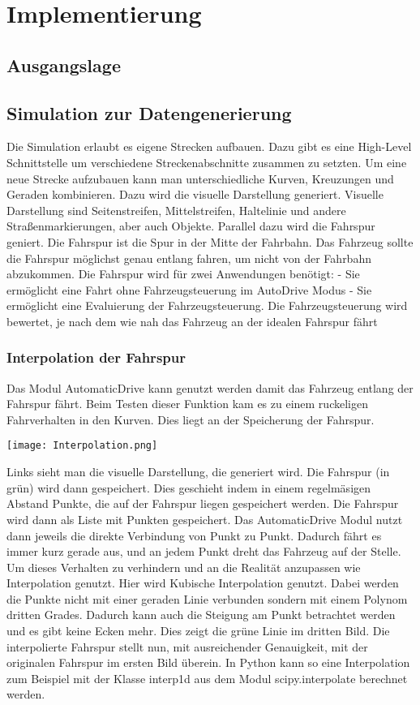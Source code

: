 
\chapter{Implementierung}

\section{Ausgangslage}

\section{Simulation zur Datengenerierung}
Die Simulation erlaubt es eigene Strecken aufbauen.
Dazu gibt es eine High-Level Schnittstelle um verschiedene Streckenabschnitte zusammen zu setzten.
Um eine neue Strecke aufzubauen kann man unterschiedliche Kurven, Kreuzungen und Geraden kombinieren.
Dazu wird die visuelle Darstellung generiert.
Visuelle Darstellung sind Seitenstreifen, Mittelstreifen, Haltelinie und andere Straßenmarkierungen, aber auch Objekte.
Parallel dazu wird die Fahrspur geniert. 
Die Fahrspur ist die Spur in der Mitte der Fahrbahn. 
Das Fahrzeug sollte die Fahrspur möglichst genau entlang fahren, um nicht von der Fahrbahn abzukommen.
Die Fahrspur wird für zwei Anwendungen benötigt:
 - Sie ermöglicht eine Fahrt ohne Fahrzeugsteuerung im AutoDrive Modus
 - Sie ermöglicht eine Evaluierung der Fahrzeugsteuerung. Die Fahrzeugsteuerung wird bewertet, je nach dem wie nah das Fahrzeug an der idealen Fahrspur fährt  

\subsection{Interpolation der Fahrspur}
Das Modul AutomaticDrive kann genutzt werden damit das Fahrzeug entlang der Fahrspur fährt.
Beim Testen dieser Funktion kam es zu einem ruckeligen Fahrverhalten in den Kurven.
Dies liegt an der Speicherung der Fahrspur.
\begin{center}
    \texttt{[image: Interpolation.png]}
\end{center}
Links sieht man die visuelle Darstellung, die generiert wird.
Die Fahrspur (in grün) wird dann gespeichert. 
Dies geschieht indem in einem regelmäsigen Abstand Punkte, die auf der Fahrspur liegen gespeichert werden.
Die Fahrspur wird dann als Liste mit Punkten gespeichert. 
Das AutomaticDrive Modul nutzt dann jeweils die direkte Verbindung von Punkt zu Punkt. 
Dadurch fährt es immer kurz gerade aus, und an jedem Punkt dreht das Fahrzeug auf der Stelle.
Um dieses Verhalten zu verhindern und an die Realität anzupassen wie Interpolation genutzt.
Hier wird Kubische Interpolation genutzt. 
Dabei werden die Punkte nicht mit einer geraden Linie verbunden sondern mit einem Polynom dritten Grades.
Dadurch kann auch die Steigung am Punkt betrachtet werden und es gibt keine Ecken mehr.
Dies zeigt die grüne Linie im dritten Bild.
Die interpolierte Fahrspur stellt nun, mit ausreichender Genauigkeit, mit der originalen Fahrspur im ersten Bild überein.
In Python kann so eine Interpolation zum Beispiel mit der Klasse interp1d aus dem Modul scipy.interpolate berechnet werden.

